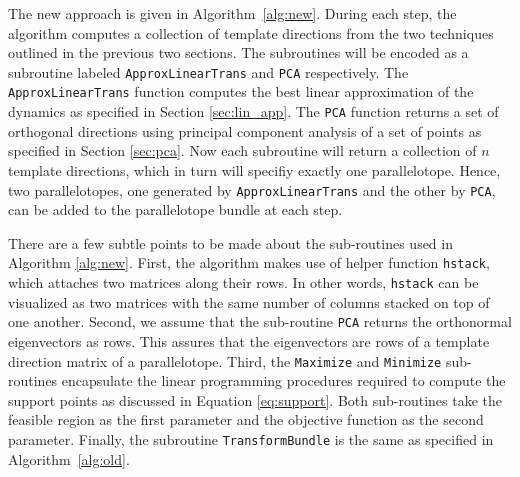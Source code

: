 The new approach is given in Algorithm~\ref{alg:new}.
%
During each step, the algorithm computes a collection of template directions from the two techniques outlined in the previous two sections. The subroutines will be encoded as a subroutine labeled \texttt{ApproxLinearTrans} and \texttt{PCA} respectively.
%
The \texttt{ApproxLinearTrans} function computes the best linear approximation of the dynamics as specified in Section \ref{sec:lin_app}.
%
The \texttt{PCA} function returns a set of orthogonal directions using principal component analysis of a set of points as specified in Section \ref{sec:pca}.
%
Now each subroutine will return a collection of $n$ template directions, which in turn will specifiy exactly one parallelotope.
%
Hence, two parallelotopes, one generated by \texttt{ApproxLinearTrans} and the other by \texttt{PCA}, can be added to the parallelotope bundle at each step.
%

There are a few subtle points to be made about the sub-routines used in Algorithm \ref{alg:new}.
%
First, the algorithm makes use of helper function \texttt{hstack}, which attaches two matrices along their rows. In other words, \texttt{hstack} can be visualized as two matrices with the same number of columns stacked on top of one another.
%
Second, we assume that the sub-routine  \texttt{PCA} returns the orthonormal eigenvectors as rows. This assures that the eigenvectors are rows of a template direction matrix of a parallelotope.
%
Third, the \texttt{Maximize} and \texttt{Minimize} sub-routines encapsulate the linear programming procedures required to compute the support points as discussed in Equation \ref{eq:support}.
%
Both sub-routines take the feasible region as the first parameter and the objective function as the second parameter.
%
 Finally, the subroutine \texttt{TransformBundle} is the same as specified in Algorithm~\ref{alg:old}.



